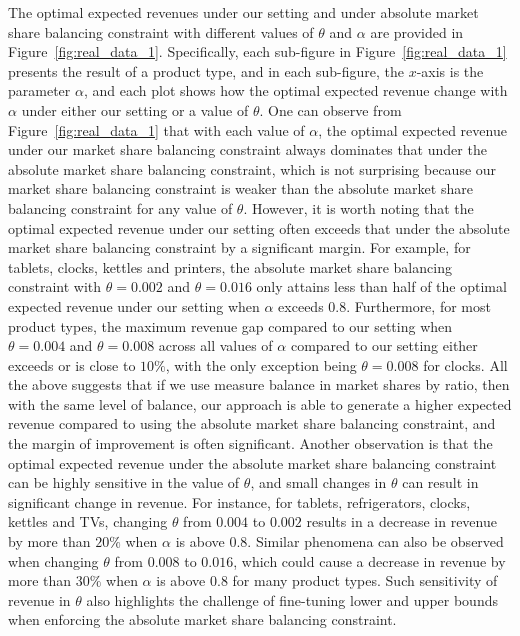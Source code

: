 \documentclass[mnsc,non-blindrev]{informs3}
\theoremstyle{definition}
\begin{document}
{The optimal expected revenues under our setting and under absolute market share balancing constraint with different values of $\theta$ and $\alpha$ are provided in Figure~\ref{fig:real_data_1}. Specifically, each sub-figure in Figure~\ref{fig:real_data_1} presents the result of a product type, and in each sub-figure, the $x$-axis is the parameter $\alpha$, and each plot shows how the optimal expected revenue change with $\alpha$ under either our setting or a value of $\theta$. One can observe from Figure~\ref{fig:real_data_1} that with each value of $\alpha$, the optimal expected revenue under our market share balancing constraint always dominates that under the absolute market share balancing constraint, which is not surprising because our market share balancing constraint is weaker than the absolute market share balancing constraint for any value of $\theta$. However, it is worth noting that the optimal expected revenue under our setting often exceeds that under the absolute market share balancing constraint by a significant margin. For example, for tablets, clocks, kettles and printers, the absolute market share balancing constraint with $\theta=0.002$ and $\theta=0.016$ only attains less than half of the optimal expected revenue under our setting when $\alpha$ exceeds $0.8$. Furthermore, for most product types, the maximum revenue gap compared to our setting when $\theta=0.004$ and $\theta=0.008$ across all values of $\alpha$ compared to our setting either exceeds or is close to $10\%$, with the only exception being $\theta=0.008$ for clocks. All the above suggests that if we use measure balance in market shares by ratio, then with the same level of balance, our approach is able to generate a higher expected revenue compared to using the absolute market share balancing constraint, and the margin of improvement is often significant. Another observation is that the optimal expected revenue under the absolute market share balancing constraint can be highly sensitive in the value of $\theta$, and small changes in $\theta$ can result in significant change in revenue. For instance, for tablets, refrigerators, clocks, kettles and TVs, changing $\theta$ from $0.004$ to $0.002$ results in a decrease in revenue by more than $20\%$ when $\alpha$ is above $0.8$. Similar phenomena can also be observed when changing $\theta$ from $0.008$ to $0.016$, which could cause a decrease in revenue by more than $30\%$ when $\alpha$ is above $0.8$ for many product types. Such sensitivity of revenue in $\theta$ also highlights the challenge of fine-tuning lower and upper bounds when enforcing the absolute market share balancing constraint.

}
\end{document}
